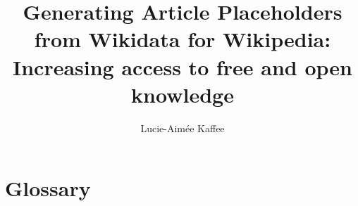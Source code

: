 \documentclass[11pt]{article}
\title{Generating Article Placeholders from Wikidata for Wikipedia:\\Increasing access to free and open knowledge}
\author{Lucie-Aim\'{e}e Kaffee}
\date{}
\begin{document}
\linenumbers
\maketitle
\newpage
\tableofcontents


\section{Glossary}


\newpage

\newpage

\end{document}
